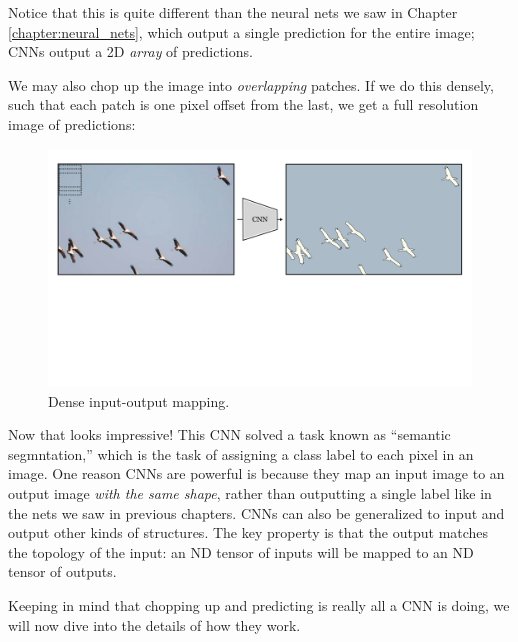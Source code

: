 Notice that this is quite different than the neural nets we saw in Chapter \ref{chapter:neural_nets}, which output a single prediction for the entire image; CNNs output a 2D \textit{array} of predictions.

We may also chop up the image into \textit{overlapping} patches. If we do this densely, such that each patch is one pixel offset from the last, we get a full resolution image of predictions:
\begin{figure}[h]
\centerline{
    \includegraphics[width=0.85\linewidth]{./figures/convolutional_neural_nets/CNN_example_fine.pdf}}
    \label{fig:convolutional_neural_nets:CNN_example_fine}
    \caption{Dense input-output mapping.}
\end{figure}

Now that looks impressive! This CNN solved a task known as ``semantic segmntation,'' which is the task of assigning a class label to each pixel in an image. One reason CNNs are powerful is because they map an input image to an output image \textit{with the same shape}, rather than outputting a single label like in the nets we saw in previous chapters. CNNs can also be generalized to input and output other kinds of structures. The key property is that the output matches the topology of the input: an ND tensor of inputs will be mapped to an ND tensor of outputs.%

Keeping in mind that chopping up and predicting is really all a CNN is doing, we will now dive into the details of how they work.

